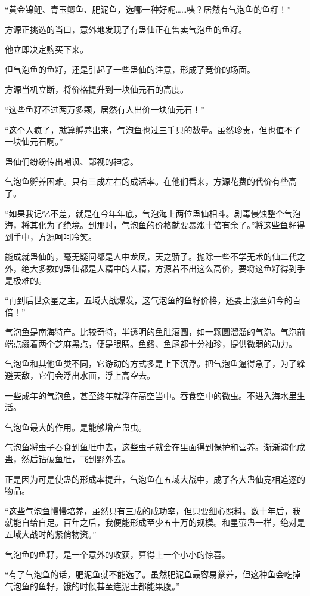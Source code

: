 \begin{this_body}
“黄金锦鲤、青玉鲫鱼、肥泥鱼，选哪一种好呢……咦？居然有气泡鱼的鱼籽！”

方源正挑选的当口，意外地发现了有蛊仙正在售卖气泡鱼的鱼籽。

他立即决定购买下来。

但气泡鱼的鱼籽，还是引起了一些蛊仙的注意，形成了竞价的场面。

方源当机立断，将价格提升到一块仙元石的高度。

“这些鱼籽不过两万多颗，居然有人出价一块仙元石！”

“这个人疯了，就算孵养出来，气泡鱼也过三千只的数量。虽然珍贵，但也值不了一块仙元石啊。”

蛊仙们纷纷传出嘲讽、鄙视的神念。

气泡鱼孵养困难。只有三成左右的成活率。在他们看来，方源花费的代价有些高了。

“如果我记忆不差，就是在今年年底，气泡海上两位蛊仙相斗。剧毒侵蚀整个气泡海，将其化为了绝境。到那时，气泡鱼的价格就要暴涨十倍有余了。”将这些鱼籽得到手中，方源呵呵冷笑。

能成就蛊仙的，毫无疑问都是人中龙凤，天之骄子。抛除一些不学无术的仙二代之外，绝大多数的蛊仙都是人精中的人精，方源若不出这么高价，要将这鱼籽得到手是极难的。

“再到后世众星之主。五域大战爆发，这气泡鱼的鱼籽价格，还要上涨至如今的百倍！”

气泡鱼是南海特产。比较奇特，半透明的鱼肚滚圆，如一颗圆溜溜的气泡。气泡前端点缀着两个芝麻黑点，便是眼睛。鱼鳍、鱼尾都十分袖珍，提供微弱的动力。

气泡鱼和其他鱼类不同，它游动的方式多是上下沉浮。把气泡鱼逼得急了，为了躲避天敌，它们会浮出水面，浮上高空去。

一些成年的气泡鱼，甚至终年就浮在高空当中。吞食空中的微虫。不进入海水里生活。

气泡鱼最大的作用。是能够增产蛊虫。

气泡鱼将虫子吞食到鱼肚中去，这些虫子就会在里面得到保护和营养。渐渐演化成蛊，然后钻破鱼肚，飞到野外去。

正是因为可是使蛊的形成率提升，气泡鱼在五域大战中，成了各大蛊仙竞相追逐的物品。

“这些气泡鱼慢慢培养，虽然只有三成的成功率，但只要细心照料。数十年后，我就能自给自足。百年之后，我便能形成至少五十万的规模。和星萤蛊一样，绝对是五域大战时的紧俏物资。”

气泡鱼的鱼籽，是一个意外的收获，算得上一个小小的惊喜。

“有了气泡鱼的话，肥泥鱼就不能选了。虽然肥泥鱼最容易豢养，但这种鱼会吃掉气泡鱼的鱼籽，饿的时候甚至连泥土都能果腹。”


\end{this_body}
